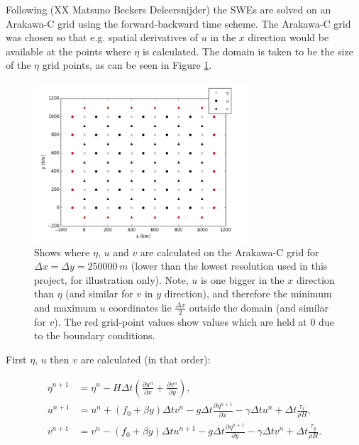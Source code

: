 \documentclass{article}
\begin{document}
Following (XX Matsuno Beckers Deleersnijder) the SWEs are solved on an Arakawa-C grid using the
forward-backward time scheme. The Arakawa-C grid was chosen so that e.g. spatial derivatives of $u$
in the $x$ direction would be available at the points where $\eta$ is calculated. The domain is
taken to be the size of the $\eta$ grid points, as can be seen in Figure \ref{fig:arakawa_c_grid}.

\begin{figure}[ht!]
    \centering
    \includegraphics[width=300px]{figures/arakawa_c_grid}
    \caption{Shows where $\eta$, $u$ and $v$ are calculated on the Arakawa-C grid for $\Delta x =
	\Delta y = 250000\, m$ (lower than the lowest resolution used in this project, for
	illustration only). Note, $u$ is one bigger in the $x$ direction than $\eta$ (and similar
	for $v$ in $y$ direction), and therefore the minimum and maximum $u$ coordinates lie
	$\frac{\Delta x}{2}$ outside the domain (and similar for $v$). The red grid-point values
	show values which are held at $0$ due to the boundary conditions. }
    \label{fig:arakawa_c_grid}
\end{figure}

First $\eta$, $u$ then $v$ are calculated (in that order):

\begin{align}
    \label{eqn:swe_arakawa1} 
    \eta^{n+1} & =  \eta^n- H \Delta t (\frac{\partial u^n}{\partial x} + \frac{\partial v^n}{\partial y} ),  \\
    \label{eqn:swe_arakawa2} 
    u^{n+1} & = u^n + (f_0 + \beta y) \Delta t v^n - g \Delta t \frac{\partial \eta^{n+1}}{\partial
    x} - \gamma \Delta t u^n + \Delta t \frac{\tau_x}{\rho H}, \\
    \label{eqn:swe_arakawa3} 
    v^{n+1} & = v^n - (f_0 + \beta y) \Delta t u^{n+1} - g \Delta t \frac{\partial \eta^{n+1}}{\partial y} -
    \gamma \Delta t v^n + \Delta t \frac{\tau_y}{\rho H}.
\end{align}
\end{document}
